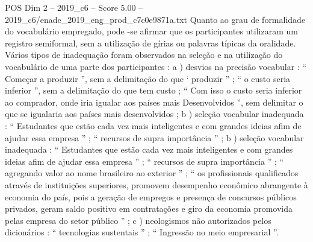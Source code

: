 \begin{textsample}{POS Dim 2 – 2019\_c6 – Score 5.00 – 2019\_c6/enade\_2019\_eng\_prod\_c7c0e9871a.txt}
Quanto ao grau de formalidade do vocabulário empregado, pode -se afirmar que os participantes utilizaram um registro semiformal, sem a utilização de gírias ou palavras típicas da oralidade.
Vários tipos de inadequação foram observados na seleção e na utilização do vocabulário de uma parte dos participantes : a ) desvios na precisão vocabular : “ Começar a produzir ”, sem a delimitação do que ‘ produzir ” ; “ o custo seria inferior ”, sem a delimitação do que tem custo ; “ Com isso o custo seria inferior ao comprador, onde iria igualar aos países mais Desenvolvidos ”, sem delimitar o que se igualaria aos países mais desenvolvidos ; b ) seleção vocabular inadequada : “ Estudantes que estão cada vez mais inteligentes e com grandes ideias afim de ajudar essa empresa ” ; “ recursos de supra importância ” ; b ) seleção vocabular inadequada : “ Estudantes que estão cada vez mais inteligentes e com grandes ideias afim de ajudar essa empresa ” ; “ recursos de supra importância ” ; “ agregando valor ao nome brasileiro ao exterior ” ; “ os profissionais qualificados através de instituições superiores, promovem desempenho econômico abrangente à economia do país, pois a geração de empregos e presença de concursos públicos privados, geram saldo positivo em contratações e giro da economia promovida pelas empresa do setor público ” ; c ) neologismos não autorizados pelos dicionários : “ tecnologias sustentais ” ; “ Ingressão no meio empresarial ”.

\end{textsample}
